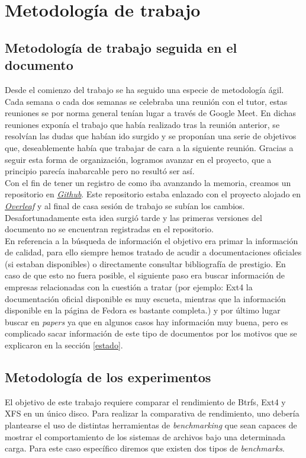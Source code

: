 \cleardoublepage
\clearpage{}

\chapter[Metodología de trabajo]{Metodología de trabajo}
\section{Metodología de trabajo seguida en el documento}
Desde el comienzo del trabajo se ha seguido una especie de metodología ágil. Cada semana o cada dos semanas se celebraba una reunión con el tutor, estas reuniones se por norma general tenían lugar a través de Google Meet. En dichas reuniones exponía el trabajo que había realizado tras la reunión anterior, se resolvían las dudas que habían ido surgido y se proponían una serie de objetivos que, deseablemente había que trabajar de cara a la siguiente reunión. Gracias a seguir esta forma de organización, logramos avanzar en el proyecto, que a principio parecía inabarcable pero no resultó ser así. \\

Con el fin de tener un registro de como iba avanzando la memoria, creamos un repositorio en \href{http://www.github.com}{\textit{Github}}. Este repositorio estaba enlazado con el proyecto alojado en \href{http://www.overleaf.com}{\textit{Overleaf}} y al final de casa sesión de trabajo se subían los cambios. Desafortunadamente esta idea surgió tarde y las primeras versiones del documento no se encuentran registradas en el repositorio.\\

En referencia a la búsqueda de información el objetivo era primar la información de calidad, para ello siempre hemos tratado de acudir a documentaciones oficiales (si estaban disponibles) o directamente consultar bibliografía de prestigio. En caso de que esto no fuera posible, el siguiente paso era buscar información de empresas relacionadas con la cuestión a tratar (por ejemplo: Ext4 la documentación oficial disponible es muy escueta, mientras que la información disponible en la página de Fedora es bastante completa.) y por último lugar buscar en \textit{papers} ya que en algunos casos hay información muy buena, pero es complicado sacar información de este tipo de documentos por los motivos que se explicaron en la sección \ref{estado}.

\section{Metodología de los experimentos}
El objetivo de este trabajo requiere comparar el rendimiento de Btrfs, Ext4 y XFS en un único disco. Para realizar la comparativa de rendimiento, uno debería plantearse el uso de distintas herramientas de \textit{benchmarking} que sean capaces de mostrar el comportamiento de los sistemas de archivos bajo una determinada carga. Para este caso específico diremos que existen dos tipos de \textit{benchmarks}. \\

